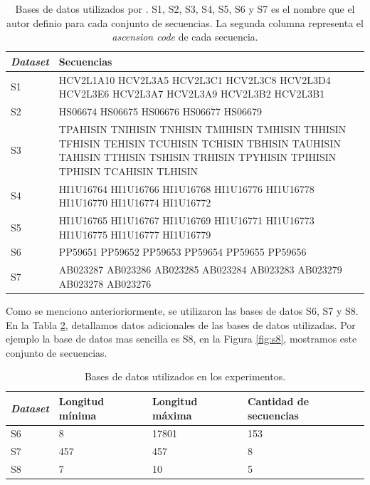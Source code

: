 \documentclass[conference]{IEEEtran}
\begin{document}
\begin{table}[h]
	\caption{Bases de datos utilizados por \cite{zablocki2009multiple}. S1, S2, S3, S4, S5, S6 y S7 es el nombre que el autor definio para cada conjunto de secuencias. La segunda columna representa el \textit{ascension code} de cada secuencia.}
	\begin{tabular}{lp{7cm}}
		
		\textbf{\textit{Dataset}} & \textbf{Secuencias} \\
		\hline			
		S1	& HCV2L1A10 HCV2L3A5 HCV2L3C1 HCV2L3C8 HCV2L3D4 HCV2L3E6 HCV2L3A7 HCV2L3A9 HCV2L3B2  HCV2L3B1		\\				
		S2	& HS06674 HS06675 HS06676 HS06677 HS06679 \\
		S3  & TPAHISIN TNIHISIN TNHISIN TMIHISIN TMHISIN THHISIN TFHISIN TEHISIN TCUHISIN TCHISIN TBHISIN TAUHISIN TAHISIN TTHISIN TSHISIN TRHISIN TPYHISIN TPIHISIN TPHISIN TCAHISIN TLHISIN \\
		S4  & HI1U16764 HI1U16766 HI1U16768 HI1U16776 HI1U16778 HI1U16770	HI1U16774	HI1U16772 \\
		S5  & HI1U16765 HI1U16767 HI1U16769 HI1U16771 HI1U16773	HI1U16775 HI1U16777 HI1U16779 \\
		S6  & PP59651 PP59652 PP59653 PP59654 PP59655 PP59656 \\
		S7  & AB023287 AB023286 AB023285 AB023284 AB023283	AB023279 AB023278 AB023276 \\
		\hline 
	\end{tabular}		
	\label{tab:datasets}
\end{table}

Como se menciono anterioriormente, se utilizaron las bases de datos S6, S7 y S8. En la Tabla \ref{tab:datasets2}, detallamos datos adicionales de las bases de datos utilizadas. Por ejemplo la base de datos mas sencilla es S8, en la Figura \ref{fig:s8}, mostramos este conjunto de secuencias.


\begin{table}[h]
	\centering
	\caption{Bases de datos utilizados en los experimentos.}
	\begin{tabular}{p{1cm}p{1cm}p{1cm}p{2cm}}
		
		\textbf{\textit{Dataset}} & \textbf{Longitud mínima} & \textbf{Longitud máxima} & \textbf{Cantidad de secuencias}\\
		\hline				
		S6  &  8 & 17801 & 153\\
		S7  &  457 & 457 & 8\\
		S8  &  7 & 10 & 5\\
		\hline 
	\end{tabular}		
	\label{tab:datasets2}
\end{table}
\end{document}
